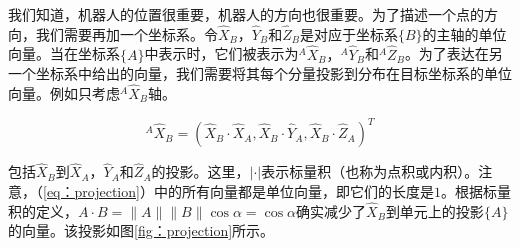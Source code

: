 我们知道，机器人的位置很重要，机器人的方向也很重要。为了描述一个点的方向，我们需要再加一个坐标系。令$\hat{X}_B$，$\hat{Y}_B$和$\hat{Z}_B$是对应于坐标系$\{B\}$的主轴的单位向量。当在坐标系$\{A\}$中表示时，它们被表示为$^A\hat{X}_B，^A\hat{Y}_B$和$^A\hat{Z}_B$。为了表达在另一个坐标系中给出的向量，我们需要将其每个分量投影到分布在目标坐标系的单位向量。例如只考虑$^A\hat{X}_B$轴。

\begin{equation}\label{eq:projection}
^A\hat{X}_B=(\hat{X}_B\cdot\hat{X}_A, \hat{X}_B\cdot\hat{Y}_A,\hat{X}_B\cdot\hat{Z}_A)^T
\end{equation}


包括$\hat{X}_B$到$\hat{X}_A$，$\hat{Y}_A$和$\hat{Z}_A$的投影。这里，$|\cdot|$表示标量积（也称为点积或内积）。注意，（\ref{eq：projection}）中的所有向量都是单位向量，即它们的长度是$1$。根据标量积的定义，$ A\cdot B =\|A\|\|B\|\cos \alpha=\cos\alpha$确实减少了$\hat{X}_B$到单元上的投影$\{A\}$的向量。该投影如图\ref{fig：projection}所示。

